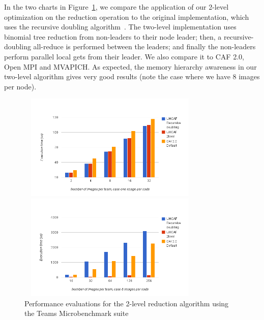 In the two charts in Figure~\ref{fig:reduction}, we compare the application of
our  2-level optimization on the reduction operation to the original implementation,
which uses the recursive doubling algorithm~\cite{doubling}. The two-level implementation uses binomial tree reduction from non-leaders to their node leader; then, a recursive-doubling all-reduce is performed between the leaders; and finally the non-leaders perform parallel local gets from their leader. We also compare it to CAF 2.0, Open MPI and MVAPICH. As expected, the memory hierarchy awareness in our two-level algorithm gives very good results (note the case where we have 8 images
per node). 
\begin{figure}[!h]
\begin{minipage}[!h]{\linewidth}
\includegraphics[width=3.5in, height=2in]{figures/reduction-1ipn-team.png}
\end{minipage}
\quad
\begin{minipage}[!h]{\linewidth}
\includegraphics[width=3.5in, height=2in]{figures/reduction-8ipn-team.png}
\end{minipage}
\caption{Performance evaluations for the 2-level reduction algorithm using the Teams Microbenchmark suite} 
\label{fig:reduction}
\end{figure}


